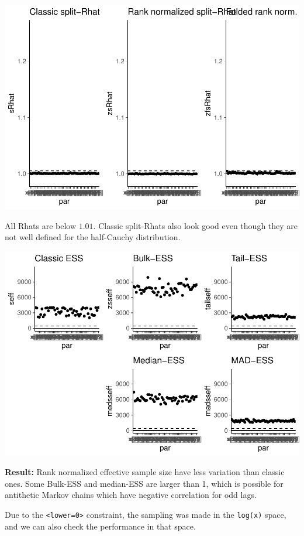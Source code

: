 \documentclass[american,]{article}
\begin{document}
\includegraphics{graphics/rhat-fit-half-nom-1.pdf}

All Rhats are below \(1.01\). Classic split-Rhats also look good even
though they are not well defined for the half-Cauchy distribution.

\includegraphics{graphics/ess-fit-half-nom-1.pdf}

\textbf{Result:} Rank normalized effective sample size have less
variation than classic ones. Some Bulk-ESS and median-ESS are larger
than 1, which is possible for antithetic Markov chains which have
negative correlation for odd lags.

Due to the \texttt{\textless{}lower=0\textgreater{}} constraint, the
sampling was made in the \texttt{log(x)} space, and we can also check
the performance in that space.
\end{document}
